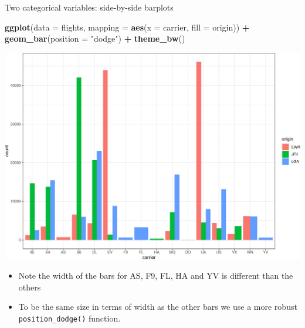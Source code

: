 \documentclass[
  ignorenonframetext,
]{beamer}
\newenvironment{Shaded}{\begin{snugshade}}{\end{snugshade}}
\newcommand{\AttributeTok}[1]{\textcolor[rgb]{0.13,0.29,0.53}{#1}}
\newcommand{\FunctionTok}[1]{\textcolor[rgb]{0.13,0.29,0.53}{\textbf{#1}}}
\newcommand{\NormalTok}[1]{#1}
\newcommand{\SpecialCharTok}[1]{\textcolor[rgb]{0.81,0.36,0.00}{\textbf{#1}}}
\newcommand{\StringTok}[1]{\textcolor[rgb]{0.31,0.60,0.02}{#1}}
\providecommand{\tightlist}{%
  \setlength{\itemsep}{0pt}\setlength{\parskip}{0pt}}
\begin{document}
\begin{frame}[fragile]{Two categorical variables: side-by-side barplots}
\protect\hypertarget{two-categorical-variables-side-by-side-barplots-1}{}
\tiny

\begin{Shaded}
\begin{Highlighting}[]
\FunctionTok{ggplot}\NormalTok{(}\AttributeTok{data =}\NormalTok{ flights, }\AttributeTok{mapping =} \FunctionTok{aes}\NormalTok{(}\AttributeTok{x =}\NormalTok{ carrier, }\AttributeTok{fill =}\NormalTok{ origin)) }\SpecialCharTok{+}
  \FunctionTok{geom\_bar}\NormalTok{(}\AttributeTok{position =} \StringTok{"dodge"}\NormalTok{) }\SpecialCharTok{+} 
  \FunctionTok{theme\_bw}\NormalTok{()}
\end{Highlighting}
\end{Shaded}

\begin{center}\includegraphics[width=0.9\linewidth,height=0.5\textheight]{Week2_Lect_files/figure-beamer/unnamed-chunk-43-1} \end{center}
\normalsize

\begin{itemize}
\tightlist
\item
  Note the width of the bars for AS, F9, FL, HA and YV is different than
  the others
\item
  To be the same size in terms of width as the other bars we use a more
  robust \texttt{position\_dodge()} function.
\end{itemize}
\end{frame}
\end{document}
